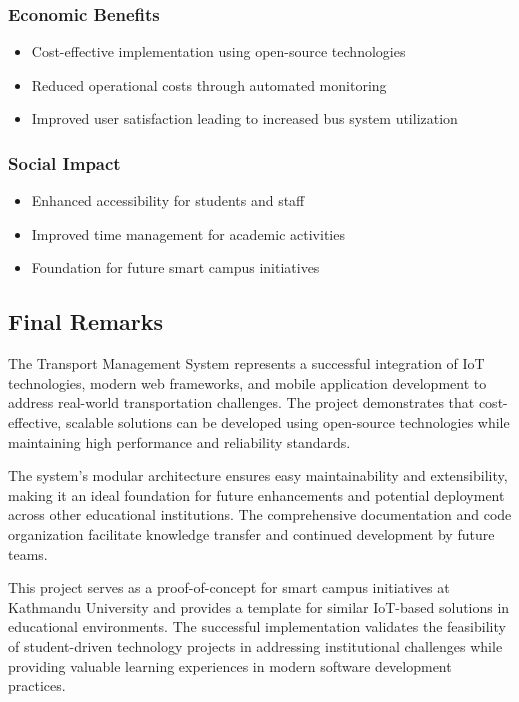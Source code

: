 \documentclass[12pt,a4paper]{article}
\begin{document}
\subsubsection{Economic Benefits}

\begin{itemize}
    \item Cost-effective implementation using open-source technologies
    \item Reduced operational costs through automated monitoring
    \item Improved user satisfaction leading to increased bus system utilization
\end{itemize}

\subsubsection{Social Impact}

\begin{itemize}
    \item Enhanced accessibility for students and staff
    \item Improved time management for academic activities
    \item Foundation for future smart campus initiatives
\end{itemize}

\subsection{Final Remarks}

The Transport Management System represents a successful integration of IoT technologies, modern web frameworks, and mobile application development to address real-world transportation challenges. The project demonstrates that cost-effective, scalable solutions can be developed using open-source technologies while maintaining high performance and reliability standards.

The system's modular architecture ensures easy maintainability and extensibility, making it an ideal foundation for future enhancements and potential deployment across other educational institutions. The comprehensive documentation and code organization facilitate knowledge transfer and continued development by future teams.

This project serves as a proof-of-concept for smart campus initiatives at Kathmandu University and provides a template for similar IoT-based solutions in educational environments. The successful implementation validates the feasibility of student-driven technology projects in addressing institutional challenges while providing valuable learning experiences in modern software development practices.
\end{document}
